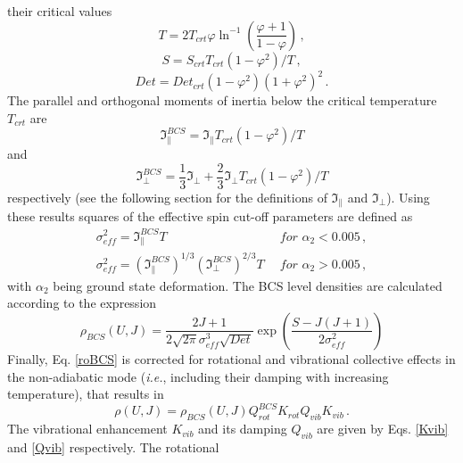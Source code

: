 \documentclass[twocolumn,amsmath,amssymb,10pt,groupedaddress,a4paper]{revtex4}
\begin{document}
their critical values
\begin{equation}
T=2T_{crt}\varphi\ln^{-1}\left(\frac{\varphi+1}{1-\varphi}\right)\,,\label{Tign}
\end{equation}
\begin{equation}
S=S_{crt}T_{crt}(1-\varphi^{2})/T\,,\label{Sign}
\end{equation}
\begin{equation}
Det=Det_{crt}(1-\varphi^{2})(1+\varphi^{2})^{2}\,.\label{Detign}
\end{equation}
The parallel and orthogonal moments of inertia below the critical
temperature $T_{crt}$ are
\begin{equation}
\Im_{\parallel}^{BCS}=\Im_{\parallel}T_{crt}(1-\varphi^{2})/T\label{momparign}
\end{equation}
and
\begin{equation}
\Im_{\perp}^{BCS}=\frac{1}{3}\Im_{\perp}+\frac{2}{3}\Im_{\perp}T_{crt}(1-\varphi^{2})/T\label{momortign}
\end{equation}
respectively (see the following section for the definitions of $\Im_{\parallel}$
and $\Im_{\perp}$). Using these results squares of the effective
spin cut-off parameters are defined as
\begin{equation}
\begin{array}{ll}
\sigma_{eff}^{2}=\Im_{\parallel}^{BCS}T & \,\,\, for\,\,\alpha_{2}<0.005\,,\\
\sigma_{eff}^{2}=\left(\Im_{\parallel}^{BCS}\right)^{1/3}\left(\Im_{\perp}^{BCS}\right)^{2/3}T & \,\,\, for\,\,\alpha_{2}>0.005\,,\end{array}\label{sigeffign}
\end{equation}
with $\alpha_{2}$ being ground state deformation. The BCS
level densities are calculated according to
the expression
\begin{equation}
\rho_{BCS}(U,J)=\frac{2J+1}{2\sqrt{2\pi}\sigma_{eff}^{3}\sqrt{Det}}\exp\left(\frac{S-J(J+1)}{2\sigma_{eff}^{2}}\right)\label{roBCS}
\end{equation}
 Finally, Eq. \ref{roBCS} is corrected for rotational and vibrational
collective effects in the non-adiabatic mode ({\it i.e.}, including their
damping with increasing temperature), that results in
\begin{equation}
\rho(U,J)=\rho_{BCS}(U,J)Q_{rot}^{BCS}K_{rot}Q_{vib}K_{vib}\,.\label{roBCScol}
\end{equation}
The vibrational enhancement $K_{vib}$ and its damping $Q_{vib}$
are given by Eqs. \ref{Kvib} and \ref{Qvib} respectively. The rotational
\end{document}
